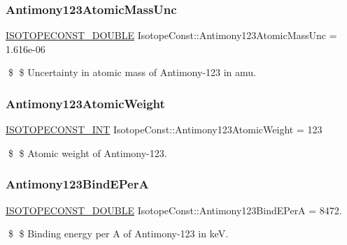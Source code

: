 \subsubsection{\texorpdfstring{Antimony123\+Atomic\+Mass\+Unc}{Antimony123AtomicMassUnc}}
{\footnotesize\ttfamily \mbox{\hyperlink{group___isotope_const-_macros_ga8f45a7272ce02c0b4c65c44636ed719a}{I\+S\+O\+T\+O\+P\+E\+C\+O\+N\+S\+T\+\_\+\+D\+O\+U\+B\+LE}} Isotope\+Const\+::\+Antimony123\+Atomic\+Mass\+Unc = 1.\+616e-\/06}

\$ \$ Uncertainty in atomic mass of Antimony-\/123 in amu. \mbox{\label{group___isotope_const-_antimony-_sb123_gac6703b38c97c950eb1b22b47849379ca}} 
\subsubsection{\texorpdfstring{Antimony123\+Atomic\+Weight}{Antimony123AtomicWeight}}
{\footnotesize\ttfamily \mbox{\hyperlink{group___isotope_const-_macros_ga5f18360b3e99483a35c32d789e62621c}{I\+S\+O\+T\+O\+P\+E\+C\+O\+N\+S\+T\+\_\+\+I\+NT}} Isotope\+Const\+::\+Antimony123\+Atomic\+Weight = 123}

\$ \$ Atomic weight of Antimony-\/123. \mbox{\label{group___isotope_const-_antimony-_sb123_ga29dd7245b40c4ac58e690565c0a25b67}} 
\subsubsection{\texorpdfstring{Antimony123\+Bind\+E\+PerA}{Antimony123BindEPerA}}
{\footnotesize\ttfamily \mbox{\hyperlink{group___isotope_const-_macros_ga8f45a7272ce02c0b4c65c44636ed719a}{I\+S\+O\+T\+O\+P\+E\+C\+O\+N\+S\+T\+\_\+\+D\+O\+U\+B\+LE}} Isotope\+Const\+::\+Antimony123\+Bind\+E\+PerA = 8472.}

\$ \$ Binding energy per A of Antimony-\/123 in keV. \mbox{\label{group___isotope_const-_antimony-_sb123_ga3630433ab5a8b1f916502694f7ba6773}} 

